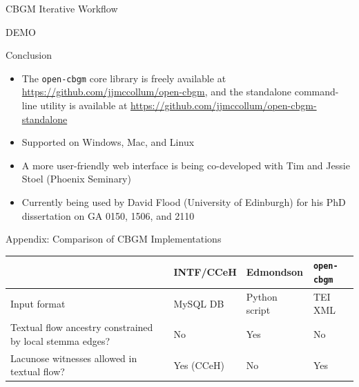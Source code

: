 \documentclass[10pt]{beamer}
\begin{document}
	\begin{frame}{CBGM Iterative Workflow}
		\begin{center}
			DEMO
		\end{center}
	\end{frame}
	\begin{frame}{Conclusion}
		\begin{itemize}
			\item The \texttt{open-cbgm} core library is freely available at \url{https://github.com/jjmccollum/open-cbgm}, and the standalone command-line utility is available at \url{https://github.com/jjmccollum/open-cbgm-standalone}
			\item Supported on Windows, Mac, and Linux
			\item A more user-friendly web interface is being co-developed with Tim and Jessie Stoel (Phoenix Seminary)
			\item Currently being used by David Flood (University of Edinburgh) for his PhD dissertation on GA 0150, 1506, and 2110
		\end{itemize}
	\end{frame}
	\begin{frame}[allowframebreaks]
		\printbibliography
	\end{frame}
	\begin{frame}{Appendix: Comparison of CBGM Implementations}
		\begin{table}
			\centering
			\begin{tabular}{p{6em}p{6em}p{6em}p{4em}}
				 & \phantom{text}\newline INTF/CCeH & \phantom{text}\newline Edmondson & \texttt{open-}\newline\texttt{cbgm}\\
				\hline
				\hline
				Input format & MySQL DB & Python script & TEI XML\\
				\hline
				Textual flow ancestry constrained by local stemma edges? & No & Yes & No\\
				\hline
				Lacunose witnesses allowed in textual flow? & Yes (CCeH) & No & Yes
			\end{tabular}
		\end{table}
	\end{frame}
\end{document}
